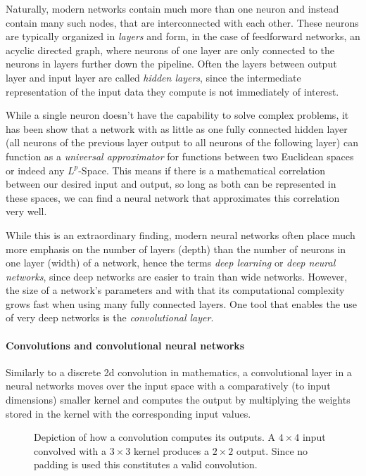 Naturally, modern networks contain much more than one neuron and instead contain many such nodes, that are interconnected with each other. 
These neurons are typically organized in \emph{layers} and form, in the case of feedforward networks, an acyclic directed graph, where neurons of one layer are only connected to the neurons in layers further down the pipeline. Often the layers between output layer and input layer are called \emph{hidden layers}, since the intermediate representation of the input data they compute is not immediately of interest.

While a single neuron doesn't have the capability to solve complex problems, it has been show that a network with as little as one fully connected hidden layer (all neurons of the previous layer output to all neurons of the following layer) can function as a \emph{universal approximator} for functions between two Euclidean spaces\cite{hornikMultilayerFeedforwardNetworks1989} or indeed any $L^p$-Space\cite{parkMinimumWidthUniversal2020}. This means if there is a mathematical correlation between our desired input and output, so long as both can be represented in these spaces, we can find a neural network that approximates this correlation very well.

While this is an extraordinary finding, modern neural networks often place much more emphasis on the number of layers (depth) than the number of neurons in one layer (width) of a network, hence the terms \emph{deep learning} or \emph{deep neural networks}, since deep networks are easier to train than wide networks. However, the size of a network's parameters and with that its computational complexity grows fast when using many fully connected layers. One tool that enables the use of very deep networks is the \emph{convolutional layer}.

\paragraph*{Convolutions and convolutional neural networks}

Similarly to a discrete 2d convolution in mathematics, a convolutional layer in a neural networks moves over the input space with a comparatively (to input dimensions) smaller kernel and computes the output by multiplying the weights stored in the kernel with the corresponding input values.

\begin{figure}[htbp]
    \caption{Depiction of how a convolution computes its outputs. A $4\times 4$ input convolved with a $3\times 3$ kernel produces a $2\times 2$ output. Since no padding is used this constitutes a valid convolution. \cite{Att00028Png}}
    \label{fig:convolution}
\end{figure}

